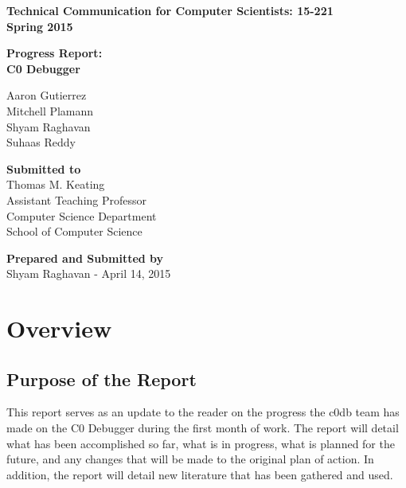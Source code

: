 \documentclass[11pt]{article}
\begin{document}
\setlength{\parindent}{2em}

\begin{titlepage}
\clearpage
\thispagestyle{empty}

\begin{center}
{\bf Technical Communication for Computer Scientists: 15-221}\\
{\bf Spring 2015}\\

\vspace{25 mm}

{\bf Progress Report:}\\
{\bf C0 Debugger}\\
\vspace{25 mm}

Aaron Gutierrez\\
Mitchell Plamann\\
Shyam Raghavan\\
Suhaas Reddy\\

\vspace{25 mm}

{\bf Submitted to}\\
Thomas M. Keating\\
Assistant Teaching Professor\\
Computer Science Department\\
School of Computer Science\\

\vspace{25 mm}

{\bf Prepared and Submitted by}\\
Shyam Raghavan - April 14, 2015
\end{center}
\end{titlepage}

\tableofcontents
\newpage


\section{Overview}
\subsection{Purpose of the Report}
This report serves as an update to the reader on the progress the c0db team has
made on the C0 Debugger during the first month of work. The report will detail
what has been accomplished so far, what is in progress, what is planned for the
future, and any changes that will be made to the original plan of action. In
addition, the report will detail new literature that has been gathered and
used.
\end{document}
